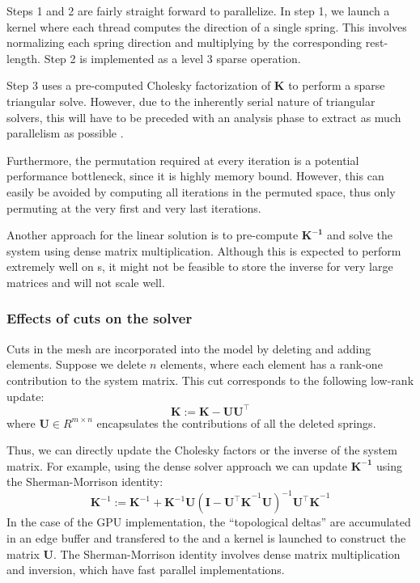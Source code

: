 Steps 1 and 2 are fairly straight forward to parallelize. In step 1, we launch a kernel where each thread computes the direction of a single spring. This involves normalizing each spring direction and multiplying by the corresponding rest-length. Step 2 is implemented as a level 3 sparse  operation.

Step 3 uses a pre-computed Cholesky factorization of $\mathbf{K}$ to perform a sparse triangular solve. However, due to the inherently serial nature of triangular solvers, this will have to be preceded with an analysis phase to extract as much parallelism as possible \cite{Mayer09}.

Furthermore, the permutation required at every iteration is a potential performance bottleneck, since it is highly memory bound. However, this can easily be avoided by computing all iterations in the permuted space, thus only permuting at the very first and very last iterations.

Another approach for the linear solution is to pre-compute $\mathbf{K^{-1}}$ and solve the system using dense matrix multiplication. Although this is expected to perform extremely well on s, it might not be feasible to store the inverse for very large matrices and will not scale well.

\subsubsection{Effects of cuts on the solver}
Cuts in the mesh are incorporated into the model by deleting and adding elements. Suppose we delete $n$ elements, where each element has a rank-one contribution to the system matrix. This cut corresponds to the following low-rank update:
\begin{equation}
  \mathbf{K}:=
  \mathbf{K} - \mathbf{U}\mathbf{U^\intercal}
\end{equation}
where $\mathbf{U} \in R^{m \times n}$ encapsulates the contributions
of all the deleted springs.

Thus, we can directly update the Cholesky factors or the inverse of the
system matrix. For example, using the dense solver approach we can update
$\mathbf{K^{-1}}$ using the Sherman-Morrison identity:
\begin{equation}
  \mathbf{K}^{-1} :=
  \mathbf{K}^{-1} +
  \mathbf{K}^{-1}\mathbf{U}(\mathbf{I} - \mathbf{U^\intercal K}^{-1}\mathbf{U})^{-1}
  \mathbf{U^\intercal K}^{-1}
\end{equation}
In the case of the GPU implementation, the ``topological deltas'' are accumulated in an edge buffer and transfered to the  and a kernel is launched to construct the matrix $\mathbf{U}$. The Sherman-Morrison identity involves dense matrix multiplication and inversion, which have fast parallel implementations.


